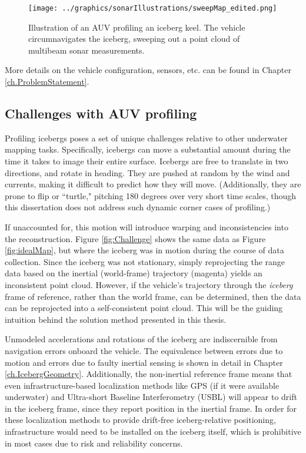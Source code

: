 \begin{figure}[!htb]
   \centering
   \texttt{[image: ../graphics/sonarIllustrations/sweepMap\_edited.png]} %
   \caption{Illustration of an AUV profiling an iceberg keel. The vehicle circumnavigates the iceberg, sweeping out a point cloud of multibeam sonar measurements. }
   \label{fig:introSetup}
\end{figure}

More details on the vehicle configuration, sensors, etc. can be found in Chapter \ref{ch.ProblemStatement}.

\subsection{Challenges with AUV profiling}

Profiling icebergs poses a set of unique challenges relative to other underwater mapping tasks. Specifically, icebergs can move a substantial amount during the time it takes to image their entire surface. Icebergs are free to translate in two directions, and rotate in heading. They are pushed at random by the wind  and currents, making it difficult to predict how they will move. (Additionally, they are prone to flip or ``turtle," pitching 180 degrees over very short time scales, though this dissertation does not address such dynamic corner cases of profiling.) 

If unaccounted for, this motion will introduce warping and inconsistencies into the reconstruction. Figure \ref{fig:Challenge} shows the same data as Figure \ref{fig:idealMap}, but where the iceberg was in motion during the course of data collection. Since the iceberg was not stationary, simply reprojecting the range data based on the inertial (world-frame) trajectory (magenta) yields an inconsistent point cloud. However, if the vehicle's trajectory through the \emph{iceberg} frame of reference, rather than the world frame, can be determined, then the data can be reprojected into a self-consistent point cloud. This will be the guiding intuition behind the solution method presented in this thesis.

Unmodeled accelerations and rotations of the iceberg are indiscernible from navigation errors onboard the vehicle. The equivalence between errors due to motion and errors due to faulty inertial sensing is shown in detail in Chapter \ref{ch.IcebergGeometry}. Additionally, the non-inertial reference frame means that even infrastructure-based localization methods like GPS (if it were available underwater) and Ultra-short Baseline Interferometry (USBL) will appear to drift in the iceberg frame, since they report position in the inertial frame. In order for these localization methods to provide drift-free iceberg-relative positioning, infrastructure would need to be installed on the iceberg itself, which is prohibitive in most cases due to risk and reliability concerns.

